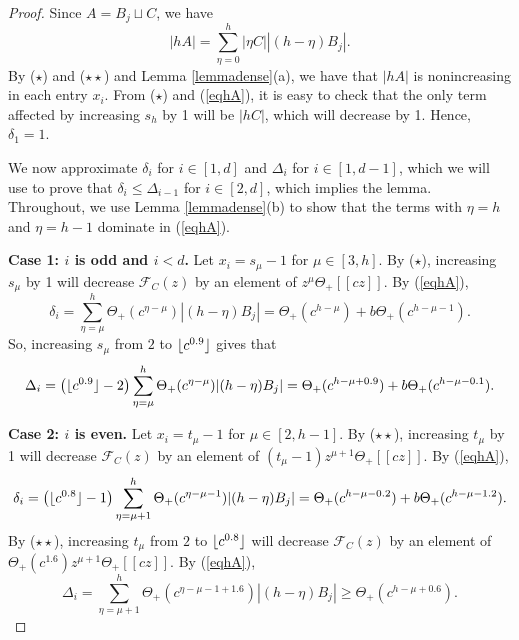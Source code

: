 \documentclass{daj}
\theoremstyle{definition}
\theoremstyle{remark}
\numberwithin{equation}{section}
\numberwithin{theorem}{section}
\newcommand{\calf}{\mathcal{F}}
\DeclarePairedDelimiter{\floor}{\lfloor}{\rfloor}
\begin{document}
\begin{proof}
    Since $A = B_j \sqcup C$, we have \begin{equation}\label{eqhA}|hA| = \sum_{\eta = 0}^h |\eta C||(h-\eta)B_j|.\end{equation} By ($\star$) and ($\star \star$) and Lemma \ref{lemmadense}(a), we have that $|hA|$ is nonincreasing in each entry $x_i$. From ($\star$) and (\ref{eqhA}), it is easy to check that the only term affected by increasing $s_h$ by 1 will be $|hC|$, which will decrease by 1. Hence, $\delta_1 = 1$.
    
    We now approximate $\delta_i$ for $i \in [1,d]$ and $\Delta_{i}$ for $i \in [1,d-1]$, which we will use to prove that $\delta_i \leq \Delta_{i-1}$ for $i \in [2,d]$, which implies the lemma. Throughout, we use Lemma \ref{lemmadense}(b) to show that the terms with $\eta = h$ and $\eta = h-1$ dominate in (\ref{eqhA}). 

    \textbf{Case 1: $i$ is odd and $i < d$.} Let $x_i = s_\mu-1$ for $\mu \in [3,h]$. By ($\star$), increasing $s_\mu$ by 1 will decrease $\calf_C(z)$ by an element of $z^\mu\Theta_+[[cz]]$. By (\ref{eqhA}), \begin{equation}\label{eq501}
        \delta_i = \sum_{\eta = \mu}^h \Theta_+(c^{\eta-\mu})|(h-\eta)B_j| = \Theta_+(c^{h-\mu})+b\Theta_+(c^{h-\mu-1}).
    \end{equation} So, increasing $s_\mu$ from $2$ to $\floor{c^{0.9}}$ gives that \begin{equation}\label{eq502}\Delta_i = \left(\floor{c^{0.9}}-2\right)\sum_{\eta = \mu}^h \Theta_+(c^{\eta-\mu})|(h-\eta)B_j| = \Theta_+(c^{h-\mu+0.9})+b\Theta_+(c^{h-\mu-0.1}).\end{equation}

    \textbf{Case 2: $i$ is even.} Let $x_i = t_\mu-1$ for $\mu \in [2,h-1]$. By ($\star \star$), increasing $t_\mu$ by 1 will decrease $\calf_C(z)$ by an element of $(t_\mu-1)z^{\mu+1}\Theta_+[[cz]]$. By (\ref{eqhA}), \begin{equation}\label{eq503}\delta_{i} = \left(\floor{c^{0.8}}-1\right)\sum_{\eta = \mu+1}^h \Theta_+(c^{\eta-\mu-1})|(h-\eta)B_j| = \Theta_+(c^{h-\mu-0.2})+ b\Theta_+(c^{h-\mu-1.2}).\end{equation} By ($\star \star$), increasing $t_\mu$ from $2$ to $\floor{c^{0.8}}$ will decrease $\calf_C(z)$ by an element of $\Theta_+(c^{1.6})z^{\mu+1}\Theta_+[[cz]]$. By (\ref{eqhA}), \begin{equation}\label{eq504}
        \Delta_{i} = \sum_{\eta = \mu+1}^h \Theta_+(c^{\eta-\mu-1+1.6})|(h-\eta)B_j| \geq \Theta_+(c^{h-\mu+0.6}).
    \end{equation}


\end{proof}
\end{document}
